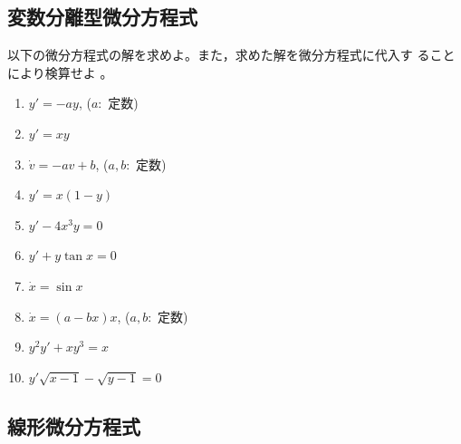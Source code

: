 \documentclass[twocolumn,11pt]{jarticle}
\begin{document}

\subsection{変数分離型微分方程式}
以下の微分方程式の解を求めよ。また，求めた解を微分方程式に代入す
ることにより検算せよ
。
\begin{enumerate}
\item \label{item:dy+ay}$y'=-ay$, ($a:$ 定数)
\item \label{item:dy-xy}$y'=xy$
\item \label{item:dv+av-b}$\dot{v}=-av+b$, \quad($a,b:$ 定数)
\item \label{item:dy-x(1-y)}$y'=x(1-y)$
\item \label{item:dy-4x3y}$y'-4x^3y=0$
\item \label{item:dy+ytanx}$y'+y\tan x=0$
\item \label{item:dx-sinx}$\dot{x}=\sin x$
\item \label{item:dx-(a-bx)x}$\dot{x}=(a-bx)x$, \quad($a,b:$ 定数)
\item \label{item:yydy+xy3-x}$y^2y'+xy^3=x$
\item \label{item:dysqrt(x-1)-sqrt(y-1)}$y'\sqrt{x-1}-\sqrt{y-1}=0$
\end{enumerate}

\subsection{線形微分方程式}
\end{document}
